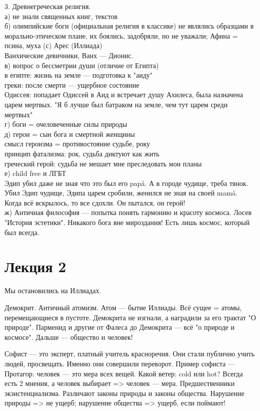 \documentclass[a4paper,12pt]{article}
\begin{document}
3. Древнегреческая религия.\\
а) не знали священных книг, текстов\\
б) олимпийские боги (официальная религия в классике) не являлись образцами в морально-этическом плане, их боялись, задобряли, но не уважали; Афина = псина, муха (с) Арес (Иллиада)\\
Ванхические девичники, Ванх --- Дионис.\\
в) вопрос о бессметрии души (отличие от Египта)\\
в египте: жизнь на земле --- подготовка к "аиду"\\
греки: после смерти --- ущербное состояние\\
Одиссея: попадает Одиссей в Аид и встречает душу Ахилеса, была назначена царем мертвых. "Я б лучше был батраком на земле, чем тут царем среди мертвых"\\
г) боги = очеловеченные силы природы\\
д) герои = сын бога и смертной женщины \\
смысл героизма = противостояние судьбе, року\\
принцип фатализма: рок, судьба диктуют как жить\\
греческий герой: судьба не мешает мне преследовать мои планы\\
е) child free и ЛГБТ\\
Эдип убил даже не зная что это был его pap\'a. А в городе чудище, треба тянок. Убил Эдип чудище, Эдипа царем сробили, женился не зная на своей mam\'a. Когда всё вскрылось, то все сдохли. Он пытался, он герой!\\
ж) Античная философия --- попытка понять гармонию и красоту космоса. Лосев "История эстетики". Никакого бога вне мироздания! Есть лишь космос, который был всегда.
\section{Лекция 2}
Мы остановились на Иллиадах.

Демокрит. Античный атомизм. Атом --- бытие Иллиады. Всё сущее = атомы, перемещающиеся в пустоте. Демокрита не изгнали, а наградили за его трактат "О природе". Парменид и другие от Фалеса до Демокрита --- всё "о природе и космосе". Дальше --- общество и человек!

Софист --- это эксперт, платный учитель красноречия. Они стали публично учить людей, просвещать. Именно они совершили переворот. Пример софиста --- Протагор: человек --- это мера всех вещей. Какой ветер: cold или hot? Всегда есть 2 мнения, а человек выбирает => человек --- мера. Предшественники экзистенциализма. Различают законы природы и законы общества. Нарушение природы => не ущерб; нарушение общества => ущерб, если поймают!
\end{document}
